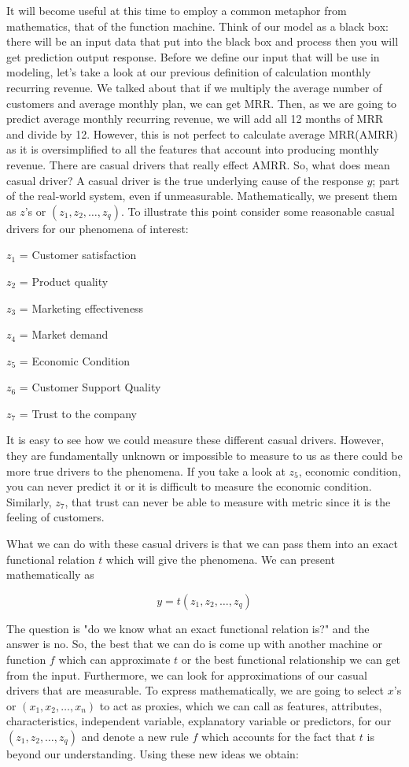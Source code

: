 \documentclass[12pt]{article}
\begin{document}
It will become useful at this time to employ a common metaphor from mathematics, that of the function machine. Think of our model as a black box: there will be an input data that put into the black box and process then you will get prediction output response. Before we define our input that will be use in modeling, let's take a look at our previous definition of calculation monthly recurring revenue. We talked about that if we multiply the average number of customers and average monthly plan, we can get MRR. Then, as we are going to predict average monthly recurring revenue, we will add all 12 months of MRR and divide by 12. However, this is not perfect to calculate average MRR(AMRR) as it is oversimplified to all the features that account into producing monthly revenue. There are casual drivers that really effect AMRR. So, what does mean casual driver? A casual driver is the true underlying cause of the response $y$; part of the real-world system, even if unmeasurable. Mathematically, we present them as $z$'s or $(z_1, z_2, \dots , z_q)$. To illustrate this point consider some reasonable casual drivers for our phenomena of interest:

$z_1$ = Customer satisfaction

$z_2$ = Product quality

$z_3$ = Marketing effectiveness

$z_4$ = Market demand

$z_5$ = Economic Condition

$z_6$ = Customer Support Quality

$z_7$ = Trust to the company

It is easy to see how we could measure these different casual drivers. However, they are fundamentally unknown or impossible to measure to us as there could be more true drivers to the phenomena. If you take a look at $z_5$, economic condition, you can never predict it or it is difficult to measure the economic condition. Similarly, $z_7$, that trust can never be able to measure with metric since it is the feeling of customers. 

What we can do with these casual drivers is that we can pass them into an exact functional relation $t$ which will give the phenomena. We can present mathematically as 

\[
y =t(z_1, z_2, \dots, z_q)
\]

The question is "do we know what an exact functional relation is?" and the answer is no. So, the best that we can do is come up with another machine or function $f$ which can approximate $t$ or the best functional relationship we can get from the input. Furthermore, we can look for approximations of our casual drivers that are measurable. To express mathematically, we are going to select $x$'s or $(x_1, x_2, \dots, x_n)$ to act as proxies, which we can call as features, attributes, characteristics, independent variable, explanatory variable or predictors, for our $(z_1, z_2, \dots, z_q)$ and denote a new rule $f$ which accounts for the fact that $t$ is beyond our understanding. Using these new ideas we obtain:
\end{document}
